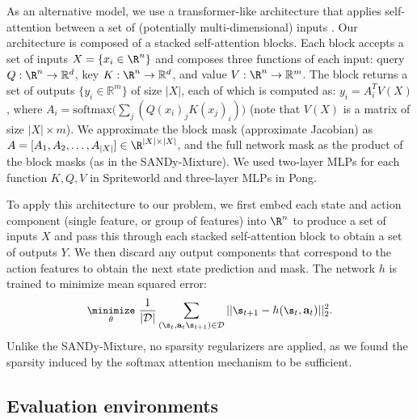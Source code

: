 \documentclass[coda.tex]{subfiles}
\begin{document}
As an alternative model, we use a transformer-like architecture that applies self-attention between a set of (potentially multi-dimensional) inputs \cite{vaswani2017attention, lee2018set}. Our architecture is composed of a stacked self-attention blocks. Each block accepts a set of inputs $X = \{x_i \in \R^n\}$ and composes three functions of each input: query $Q: \R^n \to \mathbb{R}^d$, key $K: \R^n \to \mathbb{R}^d$, and value $V: \R^n \to \mathbb{R}^m$. The block returns a set of outputs $\{y_i \in \mathbb{R}^m\}$ of size $|X|$, each of which is computed as: $y_i = A_i^TV(X)$, where $A_i = \textrm{softmax}\big(\sum_j(Q(x_i)_j K(x_j)_i)\big)$ (note that $V(X)$ is a matrix of size $|X| \times m$). We approximate the block mask (approximate Jacobian) as $A = [A_1, A_2, \dots, A_{|X|}] \in \R^{|X| \times |X|}$, and the full network mask as the product of the block masks (as in the SANDy-Mixture). We used two-layer MLPs for each function $K, Q, V$ in Spriteworld and three-layer MLPs in Pong. 

To apply this architecture to our problem, we first embed each state and action component (single feature, or group of features) into $\R^n$ to produce a set of inputs $X$ and pass this through each stacked self-attention block to obtain a set of outputs $Y$. We then discard any output components that correspond to the action features to obtain the next state prediction and mask. The network $h$ is trained to minimize mean squared error:
\begin{equation}\label{eq:sandy-transformer}\small
\underset{\theta}{\minimize} \ 
  \frac{1}{|\mathcal{D}|}\sum_{(\s_t, \mathbf{a}_t \s_{t+1}) \in \mathcal{D}} ||\s_{t+1} - h(\s_t, \mathbf{a}_t)||_2^2.
\end{equation}
Unlike the SANDy-Mixture, no sparsity regularizers are applied, as we found the sparsity induced by the softmax attention mechanism to be sufficient. 

\subsection{Evaluation environments}
\end{document}
